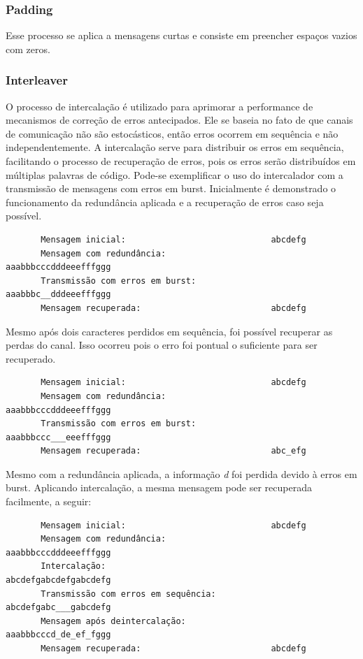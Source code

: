 	\subsubsection{Padding}
	
	Esse processo se aplica a mensagens curtas e consiste em preencher espaços vazios com zeros.
	
	\subsubsection{Interleaver}
	
	O processo de intercalação é utilizado para aprimorar a performance de mecanismos de correção de erros antecipados. Ele se baseia no fato de que canais de comunicação não são estocásticos, então erros ocorrem em sequência e não independentemente. A intercalação serve para distribuir os erros em sequência, facilitando o processo de recuperação de erros, pois os erros serão distribuídos em múltiplas palavras de código. Pode-se exemplificar o uso do intercalador com a transmissão de mensagens com erros em burst. Inicialmente é demonstrado o funcionamento da redundância aplicada e a recuperação de erros caso seja possível.

	\begin{verbatim}
	   Mensagem inicial:                             abcdefg
	   Mensagem com redundância:                     aaabbbcccdddeeefffggg
	   Transmissão com erros em burst:               aaabbbc__dddeeefffggg
	   Mensagem recuperada:                          abcdefg
	\end{verbatim}

	Mesmo após dois caracteres perdidos em sequência, foi possível recuperar as perdas do canal. Isso ocorreu pois o erro foi pontual o suficiente para ser recuperado.
	
	\begin{verbatim}
	   Mensagem inicial:                             abcdefg
	   Mensagem com redundância:                     aaabbbcccdddeeefffggg
	   Transmissão com erros em burst:               aaabbbccc___eeefffggg
	   Mensagem recuperada:                          abc_efg
	\end{verbatim}
	
	Mesmo com a redundância aplicada, a informação \textit{d} foi perdida devido à erros em burst. Aplicando intercalação, a mesma mensagem pode ser recuperada facilmente, a seguir:
	
	\begin{verbatim}
	   Mensagem inicial:                             abcdefg
	   Mensagem com redundância:                     aaabbbcccdddeeefffggg
	   Intercalação:                                 abcdefgabcdefgabcdefg
	   Transmissão com erros em sequência:           abcdefgabc___gabcdefg
	   Mensagem após deintercalação:                 aaabbbcccd_de_ef_fggg
	   Mensagem recuperada:                          abcdefg
	\end{verbatim}
	
